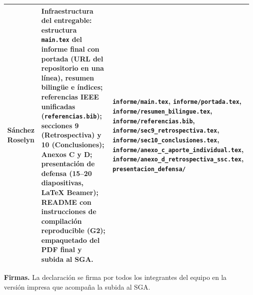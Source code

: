 \begin{center}
\begin{longtable}{|p{2.6cm}|p{6.6cm}|p{4.8cm}|}
S\'anchez Roselyn & Infraestructura del entregable: estructura \texttt{main.tex} del informe final con portada (URL del repositorio en una l\'inea), resumen biling\"ue e \'indices; referencias IEEE unificadas (\texttt{referencias.bib}); secciones 9 (Retrospectiva) y 10 (Conclusiones); Anexos C y D; presentaci\'on de defensa (15--20 diapositivas, LaTeX Beamer); README con instrucciones de compilaci\'on reproducible (G2); empaquetado del PDF final y subida al SGA. & \texttt{informe/main.tex}, \texttt{informe/portada.tex}, \texttt{informe/resumen\_bilingue.tex}, \texttt{informe/referencias.bib}, \texttt{informe/sec9\_retrospectiva.tex}, \texttt{informe/sec10\_conclusiones.tex}, \texttt{informe/anexo\_c\_aporte\_individual.tex}, \texttt{informe/anexo\_d\_retrospectiva\_ssc.tex}, \texttt{presentacion\_defensa/} \\ \hline
\end{longtable}
\end{center}

\noindent\textbf{Firmas.} La declaraci\'on se firma por todos los integrantes del equipo en la versi\'on impresa que acompa\~na la subida al SGA.

